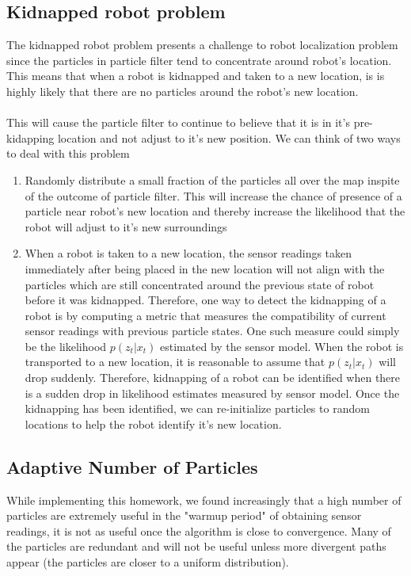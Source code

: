\documentclass[12pt, a4paper]{article}
\begin{document}
\subsection{Kidnapped robot problem}
The kidnapped robot problem presents a challenge to robot localization problem since the particles in particle filter tend to concentrate around robot's location. This means that when a robot is kidnapped and taken to a new location, is is highly likely that there are no particles around the robot's new location.\\\\
This will cause the particle filter to continue to believe that it is in it's pre-kidapping location and not adjust to it's new position. We can think of two ways to deal with this problem
\begin{enumerate}
  \item Randomly distribute a small fraction of the particles all over the map inspite of the outcome of particle filter. This will increase the chance of presence of a particle near robot's new location and thereby increase the likelihood that the robot will adjust to it's new surroundings
  \item When a robot is taken to a new location, the sensor readings taken immediately after being placed in the new location will not align with the particles which are still concentrated around the previous state of robot before it was kidnapped. Therefore, one way to detect the kidnapping of a robot is by computing a metric that measures the compatibility of current sensor readings with previous particle states. One such measure could simply be the likelihood $p(z_t|x_t)$ estimated by the sensor model. When the robot is transported to a new location, it is reasonable to assume that $p(z_t|x_t)$ will drop suddenly. Therefore, kidnapping of a robot can be identified when there is a sudden drop in likelihood estimates measured by sensor model. Once the kidnapping has been identified, we can re-initialize particles to random locations to help the robot identify it's new location.
\end{enumerate}

\subsection{Adaptive Number of Particles}

While implementing this homework, we found increasingly that a high number of particles are extremely useful in the "warmup period" of obtaining sensor readings, it is not as useful once the algorithm is close to convergence. Many of the particles are redundant and will not be useful unless more divergent paths appear (the particles are closer to a uniform distribution).\\
\end{document}
